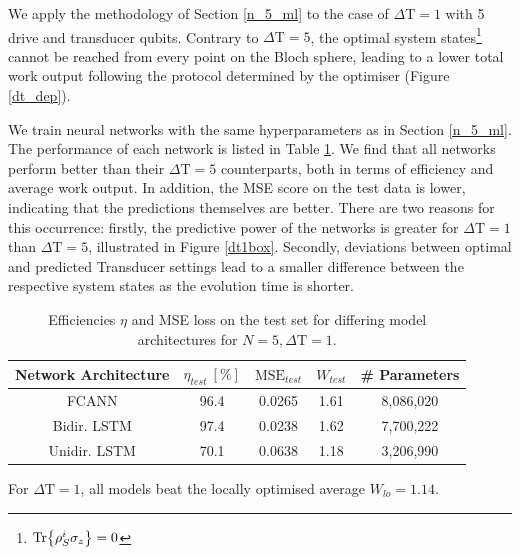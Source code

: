 We apply the methodology of Section \ref{n_5_ml} to the case of $\Delta \mathrm{T} = 1$ with 5 drive and transducer qubits.
Contrary to $\Delta \mathrm{T} = 5$, the optimal system states\footnote{$\Tr{\rho_S^i \sigma_z} = 0$} cannot be reached from every point on the Bloch sphere, leading to a lower total work output following the protocol determined by the optimiser (Figure \ref{dt_dep}).

We train neural networks with the same hyperparameters as in Section \ref{n_5_ml}.
The performance of each network is listed in Table \ref{effdt1}.
We find that all networks perform better than their $\Delta \mathrm{T} = 5$ counterparts, both in terms of efficiency and average work output.
In addition, the MSE score on the test data is lower, indicating that the predictions themselves are better.
There are two reasons for this occurrence: firstly, the predictive power of the networks is greater for $\Delta \mathrm{T} = 1$ than $\Delta \mathrm{T} = 5$, illustrated in Figure \ref{dt1box}.
Secondly, deviations between optimal and predicted Transducer settings lead to a smaller difference between the respective system states as the evolution time is shorter.

\begin{table}[h]
	\centering
	\begin{tabular}{ c | c | c | c | c }
		Network Architecture & $\eta_{test} \ [\%]$ & $\mathrm{MSE}_{test}$  & $W_{test}$ & \# Parameters \\
		\hline
		FCANN        & 96.4 & 0.0265 & 1.61 & 8,086,020 \\
		Bidir. LSTM  & 97.4 & 0.0238 & 1.62 & 7,700,222 \\
		Unidir. LSTM & 70.1 & 0.0638 & 1.18 & 3,206,990 \\
	\end{tabular}
	\caption{Efficiencies $\eta$ and MSE loss on the test set for differing model architectures for $N=5, \Delta \mathrm{T} = 1$.}
	\label{effdt1}
\end{table}

For $\Delta \mathrm{T} = 1$, all models beat the locally optimised average $W_{lo} = 1.14$.


